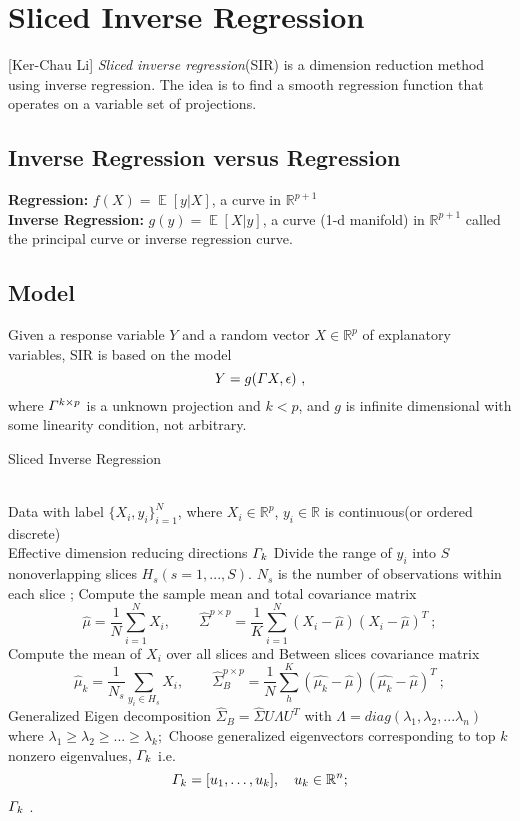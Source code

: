 \documentclass[twoside]{article}
\theoremstyle{definition}
\theoremstyle{definition}
\theoremstyle{remark}
\def\R{{\mathbb R}}
\begin{document}
\section{Sliced Inverse Regression} 


[Ker-Chau Li] \emph{Sliced inverse regression}(SIR) is a dimension reduction method using inverse regression. The idea is to find a smooth regression function that operates on a variable set of projections.
\subsection{Inverse Regression versus Regression}
\textbf{Regression:}  $f(X) = \mathop{\mathbb{E}}[y|X]$, a curve in $\mathbb{R}^{p+1}$ \\
\textbf{Inverse Regression:} $g(y) = \mathop{\mathbb{E}}[X|y]$, a curve (1-d manifold) in $\mathbb{R}^{p+1}$ called the principal curve or inverse regression curve.
\subsection{Model}
Given a response variable $Y$ and a random vector $X\in \mathbb{R}^p$ of explanatory variables, SIR is based on the model 
$$Y = g(\mathnormal{\Gamma} X, \epsilon) \ ,$$
where $\mathnormal{\Gamma}^{k\times p}$ is a unknown projection and $k<p$, and $g$ is infinite dimensional with some linearity condition, not arbitrary.

\begin{algorithm}[htb]   
\caption{Sliced Inverse Regression}   
\label{alg:sir}   
\begin{algorithmic}[1] %
\REQUIRE ~~\\ %
 Data with label $\{X_i,y_i\}_{i=1}^N$, where $X_i\in \mathbb{R}^p$, $y_i\in \mathbb{R}$ is continuous(or ordered discrete)
\ENSURE ~~\\ %
Effective dimension reducing directions $\mathnormal{\Gamma}_k$
\STATE Divide the range of $y_i$ into $S$ nonoverlapping slices $H_s(s = 1,...,S)$. $N_s$ is the number of observations within each slice ; 
\STATE Compute the sample mean and total covariance matrix 
  $$\hat{\mu} = \frac{1}{N} \sum\limits_{i=1}^N X_i,\quad\quad\hat{\Sigma}^{p\times p} = \frac{1}{K} \sum_{i=1}^N(X_i - \hat{\mu})(X_i -\hat{\mu})^T \ ; $$   
\STATE Compute the mean of $X_i$ over all slices and Between slices covariance matrix 
 $$ \hat{\mu}_k = \frac{1}{N_s} \sum\limits_{y_i\in H_s } X_i, \quad \quad \hat{\Sigma}_B^{p\times p} = \frac{1}{N} \sum_{h}^K(\hat{\mu_k} - \hat{\mu})(\hat{\mu_k} - \hat{\mu})^T\  ;$$
\STATE Generalized Eigen decomposition 
$\hat{\Sigma}_B = \hat{\Sigma} U\Lambda U^T $ with $\Lambda = diag(\lambda_1,\lambda_2,...\lambda_n)$ where  $\lambda_1 \ge \lambda_2 \ge ... \ge \lambda_k;$ 
\STATE Choose generalized eigenvectors corresponding to top $k$ nonzero eigenvalues, $\mathnormal{\Gamma}_k$ i.e.
$$\mathnormal{\Gamma}_k=[u_1,\ldots,u_k], \ \ \ u_k\in \R^n ;$$ 
\RETURN $\mathnormal{\Gamma_k}$ . %
\end{algorithmic}  
\end{algorithm}  
\end{document}
